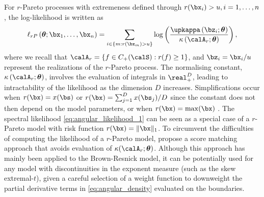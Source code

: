 \documentclass[12pt]{article}
\begin{document}

For $r$-Pareto processes with extremeness defined through $r(\bx_i)>u, i=1, \ldots,n$, the log-likelihood is written as
%
\begin{equation}\label{eq:angular_likelihood_3}
\ell_{rP}\left( \bm \theta; \bx_1, \ldots, \bx_n \right) = \sum_{i \in \left\{ m: r(\bx_m) > u \right\}} \log \left( \frac{\upkappa \left(\bz_i; \bm \theta \right)}{\kappa\left( \calA_r; \bm \theta \right)} \right),    
\end{equation}
%
where we recall that $\calA_r = \left\{ f \in C_+(\calS): r(f) \geq 1 \right\}$, and $\bz_{i} = \bx_{i}/u$ represent the realizations of the $r$-Pareto process. The normalising constant, $\kappa\left( \calA_r; \bm \theta \right)$, involves the evaluation of integrals in $\real_+^D$, leading to intractability of the likelihood as the dimension $D$ increases. Simplifications occur when $r(\bx) = x(\bs)$ or $r(\bx) = \sum_{j=1}^D x(\bs_j)/D$ since the constant does not then depend on the model parameters, or when $r(\bx) = \max(\bx)$ \citep[see][]{deFondeville.Davison:2018, Dombry.etal:2024}. 
The spectral likelihood \eqref{eq:angular_likelihood_1} can be seen as a special case of a $r$-Pareto model with risk function $r(\bx) = \| \bx \|_1$. 
%
To circumvent the difficulties of computing the likelihood of a $r$-Pareto model, \citet{deFondeville.Davison:2018} propose a score matching approach that 
avoids
evaluation of $\kappa(\calA_r;\bm \theta)$. 
Although this approach has mainly been applied to the Brown-Resnick model, it can be potentially used for any model with discontinuities in the exponent measure (such as the skew extremal-$t$), given a careful selection of a weight function to downweight the partial derivative terms in \eqref{eq:angular_density} evaluated on the boundaries.
\end{document}
